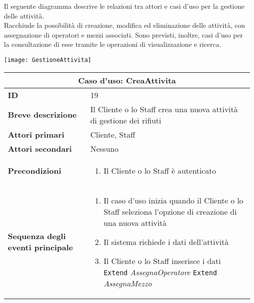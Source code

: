 \documentclass[a4paper]{report}
\begin{document}
\clearpage
{}

Il seguente diagramma descrive le relazioni tra attori e casi d’uso per la gestione delle attività.\\
Racchiude la possibilità di creazione, modifica ed eliminazione delle attività, con assegnazione di operatori e mezzi associati. Sono previsti, inoltre, casi d’uso per la consultazione di esse tramite le operazioni di visualizzazione e ricerca.


\begin{figure*}[ht]
    \centering
    \texttt{[image: GestioneAttivita]}
\end{figure*}

\clearpage
\begin{table}[H]
\vspace*{-0cm}
\renewcommand{\arraystretch}{1.9}
\begin{tabular}{|p{3.9cm}|p{9.9cm}|}
\hline
\multicolumn{2}{|c|}{\textbf{Caso d’uso: CreaAttivita}} \\ \hline
	\textbf{ID} & 19 \\ \hline
	\textbf{Breve descrizione} & Il Cliente o lo Staff crea una nuova attività di gestione dei rifiuti \\ \hline
	\textbf{Attori primari} & Cliente, Staff \\ \hline
	\textbf{Attori secondari} & Nessuno \\ \hline
	\textbf{Precondizioni} & \begin{enumerate}[leftmargin=14pt,label=\arabic*.,labelsep=0.5em,topsep=0pt,partopsep=0pt,parsep=0pt,itemsep=0pt]
    \item Il Cliente o lo Staff è autenticato
\end{enumerate} \\ \hline
	\textbf{Sequenza degli eventi principale} & \begin{enumerate}[leftmargin=14pt,label=\arabic*.,labelsep=0.5em,topsep=0pt,partopsep=0pt,parsep=0pt,itemsep=0pt]
    \item Il caso d’uso inizia quando il Cliente o lo Staff seleziona l'opzione di creazione di una nuova attività
    \item Il sistema richiede i dati dell’attività
    \item Il Cliente o lo Staff inserisce i dati
    \newline \texttt{Extend} \textit{AssegnaOperatore}
    \newline \texttt{Extend} \textit{AssegnaMezzo}

\end{enumerate}
\end{tabular}
\end{table}
\end{document}
